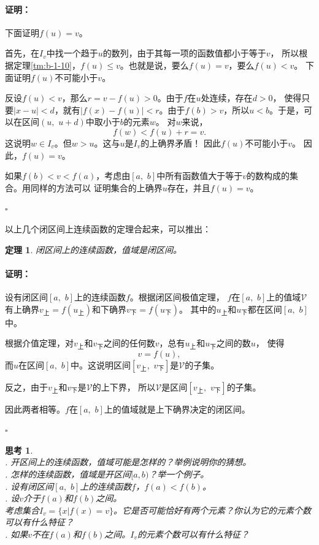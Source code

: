 \documentclass[12pt,UTF8]{ctexbook}
\newtheorem{tm}{定理}[section]
\newtheorem{sk}{思考}[section]
\renewenvironment{proof}{\paragraph{\textbf{证明：}}}{\hfill$\square$}
\begin{document}
\begin{appendix}
\begin{proof}
    下面证明$f(u) = v$。

    首先，在$I_v$中找一个趋于$u$的数列，由于其每一项的函数值都小于等于$v$，
    所以根据定理\ref{tm:b-1-10}，$f(u)\leqslant v$。也就是说，要么$f(u) = v$，要么$f(u) < v$。
    下面证明$f(u)$不可能小于$v$。

    反设$f(u)< v$，那么$r = v - f(u) > 0$。由于$f$在$u$处连续，存在$d>0$，
    使得只要$|x - u| < d$，就有$|f(x) - f(u)| < r$。由于$f(b) > v$，所以$u < b$。于是，可以在区间$(u, \,\, u+d)$中取小于$b$的元素$w$。
    对$w$来说，
    $$ f(w) < f(u) + r = v.$$
    这说明$w\in I_v$。但$w>u$。这与$u$是$I_v$的上确界矛盾！
    因此$f(u)$不可能小于$v$。
    因此，$f(u) = v$。

    如果$f(b) < v < f(a)$，考虑由$[a, \,\,b]$中所有函数值大于等于$v$的数构成的集合。用同样的方法可以
    证明集合的上确界$u$存在，并且$f(u) = v$。

\end{proof}

以上几个闭区间上连续函数的定理合起来，可以推出：
\begin{tm}
    闭区间上的连续函数，值域是闭区间。
\end{tm}
\begin{proof}
    设有闭区间$[a,\,\,b]$上的连续函数$f$。根据闭区间极值定理，
    $f$在$[a,\,\,b]$上的值域$\mathcal{V}$有上确界$v_{\text{上}} = f(u_{\text{上}})$和下确界$v_{\text{下}} = f(u_{\text{下}})$。
    其中的$u_{\text{上}}$和$u_{\text{下}}$都在区间$[a,\,\,b]$中。

    根据介值定理，对$v_{\text{上}}$和$v_{\text{下}}$之间的任何数$v$，总有$u_{\text{上}}$和$u_{\text{下}}$之间的数$u$，
    使得
    $$ v = f(u),$$
    而$u$在区间$[a,\,\,b]$中。这说明区间$[v_{\text{上}},\,\,v_{\text{下}}]$是$\mathcal{V}$的子集。

    反之，由于$v_{\text{上}}$和$v_{\text{下}}$是$\mathcal{V}$的上下界，
    所以$\mathcal{V}$是区间$[v_{\text{上}},\,\,v_{\text{下}}]$的子集。

    因此两者相等。$f$在$[a,\,\,b]$上的值域就是上下确界决定的闭区间。

\end{proof}

\begin{sk}
    \mbox{} \\
    . 开区间上的连续函数，值域可能是怎样的？举例说明你的猜想。\\
    . 怎样的连续函数，值域是开区间$[a, b)$？举一个例子。\\
    . 设有闭区间$[a,\,\,b]$上的连续函数$f$，$f(a) < f(b)$。\\
    . 设$v$介于$f(a)$和$f(b)$之间。\\
    考虑集合$I_v = \{x | f(x) = v\}$。它是否可能恰好有两个元素？你认为它的元素个数可以有什么特征？\\
    . 如果$v$不在$f(a)$和$f(b)$之间。$I_v$的元素个数可以有什么特征？
\end{sk}


\end{appendix}
\end{document}
